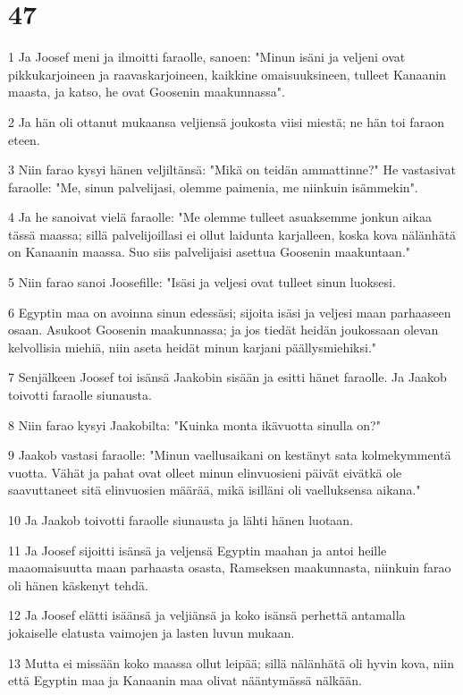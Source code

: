 \chapter{47}

\par 1 Ja Joosef meni ja ilmoitti faraolle, sanoen: "Minun isäni ja veljeni ovat pikkukarjoineen ja raavaskarjoineen, kaikkine omaisuuksineen, tulleet Kanaanin maasta, ja katso, he ovat Goosenin maakunnassa".
\par 2 Ja hän oli ottanut mukaansa veljiensä joukosta viisi miestä; ne hän toi faraon eteen.
\par 3 Niin farao kysyi hänen veljiltänsä: "Mikä on teidän ammattinne?" He vastasivat faraolle: "Me, sinun palvelijasi, olemme paimenia, me niinkuin isämmekin".
\par 4 Ja he sanoivat vielä faraolle: "Me olemme tulleet asuaksemme jonkun aikaa tässä maassa; sillä palvelijoillasi ei ollut laidunta karjalleen, koska kova nälänhätä on Kanaanin maassa. Suo siis palvelijaisi asettua Goosenin maakuntaan."
\par 5 Niin farao sanoi Joosefille: "Isäsi ja veljesi ovat tulleet sinun luoksesi.
\par 6 Egyptin maa on avoinna sinun edessäsi; sijoita isäsi ja veljesi maan parhaaseen osaan. Asukoot Goosenin maakunnassa; ja jos tiedät heidän joukossaan olevan kelvollisia miehiä, niin aseta heidät minun karjani päällysmiehiksi."
\par 7 Senjälkeen Joosef toi isänsä Jaakobin sisään ja esitti hänet faraolle. Ja Jaakob toivotti faraolle siunausta.
\par 8 Niin farao kysyi Jaakobilta: "Kuinka monta ikävuotta sinulla on?"
\par 9 Jaakob vastasi faraolle: "Minun vaellusaikani on kestänyt sata kolmekymmentä vuotta. Vähät ja pahat ovat olleet minun elinvuosieni päivät eivätkä ole saavuttaneet sitä elinvuosien määrää, mikä isilläni oli vaelluksensa aikana."
\par 10 Ja Jaakob toivotti faraolle siunausta ja lähti hänen luotaan.
\par 11 Ja Joosef sijoitti isänsä ja veljensä Egyptin maahan ja antoi heille maaomaisuutta maan parhaasta osasta, Ramseksen maakunnasta, niinkuin farao oli hänen käskenyt tehdä.
\par 12 Ja Joosef elätti isäänsä ja veljiänsä ja koko isänsä perhettä antamalla jokaiselle elatusta vaimojen ja lasten luvun mukaan.
\par 13 Mutta ei missään koko maassa ollut leipää; sillä nälänhätä oli hyvin kova, niin että Egyptin maa ja Kanaanin maa olivat nääntymässä nälkään.
